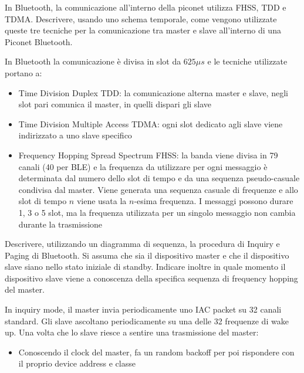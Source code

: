 \begin{questions}
    \question In Bluetooth, la comunicazione all'interno della piconet utilizza FHSS, TDD e TDMA. Descrivere, usando uno schema temporale, come vengono utilizzate queste tre tecniche per la comunicazione tra master e slave all'interno di una Piconet Bluetooth.
    
    \begin{solution}
        In Bluetooth la comunicazione è divisa in slot da $625 \mu s$ e le tecniche utilizzate portano a: 
        \begin{itemize}
            \item Time Division Duplex TDD: la comunicazione alterna master e slave, negli slot pari comunica il master, in quelli dispari gli slave
            
            \item Time Division Multiple Access TDMA: ogni slot dedicato agli slave viene indirizzato a uno slave specifico
            
            \item Frequency Hopping Spread Spectrum FHSS: la banda viene divisa in 79 canali (40 per BLE) e la frequenza da utilizzare per ogni messaggio è determinata dal numero dello slot di tempo e da una sequenza pseudo-casuale condivisa dal master. Viene generata una sequenza casuale di frequenze e allo slot di tempo $n$ viene usata la $n$-esima frequenza. I messaggi possono durare 1, 3 o 5 slot, ma la frequenza utilizzata per un singolo messaggio non cambia durante la trasmissione
        \end{itemize}
    \end{solution}
    
    \question Descrivere, utilizzando un diagramma di sequenza, la procedura di Inquiry e Paging di Bluetooth. Si assuma che sia il dispositivo master e che il dispositivo slave siano nello stato iniziale di standby. Indicare inoltre in quale momento il dispositivo slave viene a conoscenza della specifica sequenza di frequency hopping del master.
    
    \begin{solution}
        In inquiry mode, il master invia periodicamente uno IAC packet su 32 canali standard. Gli slave ascoltano periodicamente su una delle 32 frequenze di wake up. Una volta che lo slave riesce a sentire una trasmissione del master: 
        \begin{itemize}
            \item Conoscendo il clock del master, fa un random backoff per poi rispondere con il proprio device address e classe
            

\end{itemize}
\end{solution}
\end{questions}
